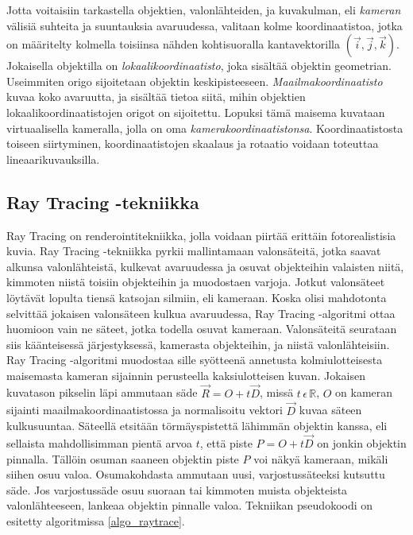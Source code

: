 \documentclass[a4paper,12pt, titlepage]{article}
\theoremstyle{break}
\newcommand{\R}{\mathbb{R}}
\begin{document}
Jotta voitaisiin tarkastella objektien, valonlähteiden, ja kuvakulman, eli \emph{kameran} välisiä suhteita ja suuntauksia avaruudessa, valitaan kolme koordinaatistoa, jotka on määritelty kolmella toisiinsa nähden kohtisuoralla kantavektorilla $(\vec{i},\vec{j},\vec{k})$. Jokaisella objektilla on \emph{lokaalikoordinaatisto}, joka sisältää objektin geometrian. Useimmiten origo sijoitetaan objektin keskipisteeseen. \emph{Maailmakoordinaatisto} kuvaa koko avaruutta, ja sisältää tietoa siitä, mihin objektien lokaalikoordinaatistojen origot on sijoitettu. Lopuksi tämä maisema kuvataan virtuaalisella kameralla, jolla on oma \emph{kamerakoordinaatistonsa}. Koordinaatistosta toiseen siirtyminen, koordinaatistojen skaalaus ja rotaatio voidaan toteuttaa lineaarikuvauksilla.\cite{janke}

\subsection{Ray Tracing -tekniikka}

Ray Tracing on renderointitekniikka, jolla voidaan piirtää erittäin fotorealistisia kuvia. Ray Tracing -tekniikka pyrkii mallintamaan valonsäteitä, jotka saavat alkunsa valonlähteistä, kulkevat avaruudessa ja osuvat objekteihin valaisten niitä, kimmoten niistä toisiin objekteihin ja muodostaen varjoja. Jotkut valonsäteet löytävät lopulta tiensä katsojan silmiin, eli kameraan. Koska olisi mahdotonta selvittää jokaisen valonsäteen kulkua avaruudessa, Ray Tracing -algoritmi ottaa huomioon vain ne säteet, jotka todella osuvat kameraan. Valonsäteitä seurataan siis käänteisessä järjestyksessä, kamerasta objekteihin, ja niistä valonlähteisiin.\cite{janke}\\

Ray Tracing -algoritmi muodostaa sille syötteenä annetusta kolmiulotteisesta maisemasta kameran sijainnin perusteella kaksiulotteisen kuvan. Jokaisen kuvatason pikselin läpi ammutaan säde $\vec{R}=O+t\vec{D}$, missä $t\,\epsilon\,\R$, $O$ on kameran sijainti maailmakoordinaatistossa ja normalisoitu vektori $\vec{D}$ kuvaa säteen kulkusuuntaa. Säteellä etsitään törmäyspistettä lähimmän objektin kanssa, eli sellaista mahdollisimman pientä arvoa $t$, että piste $P=O+t\vec{D}$ on jonkin objektin pinnalla. Tällöin osuman saaneen objektin piste $P$ voi näkyä kameraan, mikäli siihen osuu valoa. Osumakohdasta ammutaan uusi, varjostussäteeksi kutsuttu säde. Jos varjostussäde osuu suoraan tai kimmoten muista objekteista valonlähteeseen, lankeaa objektin pinnalle valoa.\cite{janke} Tekniikan pseudokoodi on esitetty algoritmissa \ref{algo_raytrace}.\\
\end{document}
